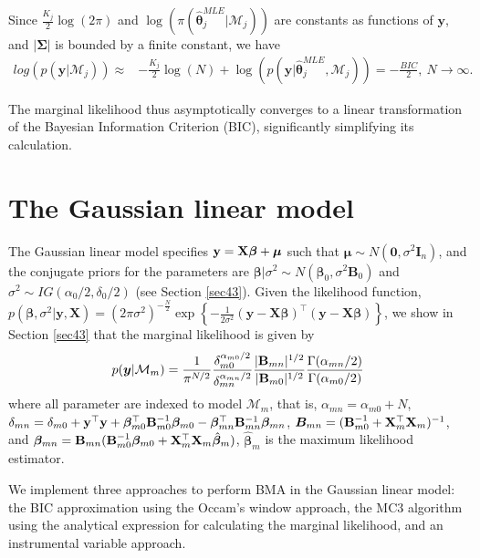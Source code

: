 Since $\frac{K_j}{2}\log(2\pi)$ and $\log(\pi(\bm{\hat{\theta}}_j^{MLE} | \mathcal{M}_j))$ are constants as functions of $\bm{y}$, and $|\bm{\Sigma}|$ is bounded by a finite constant, we have
\begin{align*}
	log\left(p(\bm{y} | \mathcal{M}_j)\right)\approx& -\frac{K_j}{2}\log(N)+\log(p(\bm{y}| \bm{\hat{\theta}}_j^{MLE},\mathcal{M}_j))= -\frac{BIC}{2}, \ N \rightarrow \infty.
\end{align*}

The marginal likelihood thus asymptotically converges to a linear transformation of the Bayesian Information Criterion (BIC), significantly simplifying its calculation.

\section{The Gaussian linear model}\label{sec10_2}

The Gaussian linear model specifies $\bf{y}=\bm{X}\bm{\beta}+\bm{\mu}$ such that $\bm{\mu}\sim{N}(\bm{0},\sigma^2\bm{I}_n)$, and the conjugate priors for the parameters are $\bm{\beta}|\sigma^2 \sim {N}(\bm{\beta}_0, \sigma^2 \bm{B}_0)$ and $\sigma^2 \sim {I}{G}(\alpha_0/2, \delta_0/2)$ (see Section \ref{sec43}).
Given the likelihood function, $p(\bm{\beta}, \sigma^2|\bm{y}, \bm{X}) = (2\pi\sigma^2)^{-\frac{N}{2}} \exp \left\{-\frac{1}{2\sigma^2} (\bm{y} - \bm{X\beta})^{\top}(\bm{y} - \bm{X\beta}) \right\}$, we show in Section \ref{sec43} that the marginal likelihood is given by 
\begin{equation*}
	p(\bm{y}|\mathcal{M}_m)= \frac{1}{\pi^{N/2}}\frac{\delta_{m0}^{\alpha_{m0}/2}}{\delta_{mn}^{\alpha_{mn}/2}}\frac{|{\bf{B}}_{mn}|^{1/2}}{|{\bf{B}}_{m0}|^{1/2}}\frac{\Gamma(\alpha_{mn}/2)}{\Gamma(\alpha_{m0}/2)}
\end{equation*}
where all parameter are indexed to model $\mathcal{M}_m$, that is, $\alpha_{mn}=\alpha_{m0}+N$, $\delta_{mn}=\delta_{m0} + {\bf{y}}^{\top}{\bf{y}} + \bm{\beta}_{m0}^{\top}{\bf{B}}_{m0}^{-1}\bm{\beta}_{m0} - \bm{\beta}_{mn}^{\top}{\bf{B}}_{mn}^{-1}\bm{\beta}_{mn}$, $\bm{B}_{mn}=({\bf{B}}_{m0}^{-1} + {\bf{X}}^{\top}_m{\bf{X}}_m)^{-1}$, and $\bm{\beta}_{mn} = {{\bf{B}}}_{mn}({\bf{B}}_{m0}^{-1}\bm{\beta}_{m0} + {\bf{X}}^{\top}_m{\bf{X}}_m\hat{\bm{\beta}}_m)$, $\hat{\bm{\beta}}_m$ is the maximum likelihood estimator.

We implement three approaches to perform BMA in the Gaussian linear model: the BIC approximation using the Occam's window approach, the MC3 algorithm using the analytical expression for calculating the marginal likelihood, and an instrumental variable approach.

